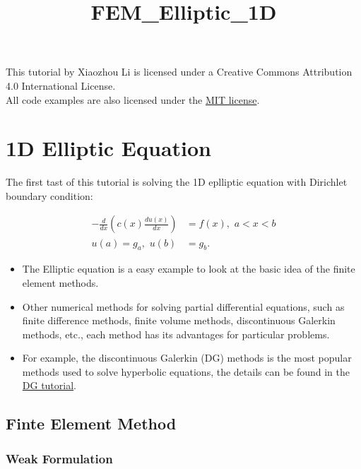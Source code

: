 \documentclass[11pt]{article}
\title{FEM\_Elliptic\_1D}
\providecommand{\tightlist}{%
      \setlength{\itemsep}{0pt}\setlength{\parskip}{0pt}}
\begin{document}
    
    
    \maketitle
    
    

    
    This tutorial by Xiaozhou Li is licensed under a Creative Commons
Attribution 4.0 International License.\\
All code examples are also licensed under the
\href{http://opensource.org/licenses/MIT}{MIT license}.

    \section{1D Elliptic Equation}\label{d-elliptic-equation}

The first tast of this tutorial is solving the 1D eplliptic equation
with Dirichlet boundary condition:

\begin{align}
   -\frac{d}{dx}\left(c(x)\frac{d u(x)}{dx}\right) & = f(x),\,\, a < x < b \\
   u(a) = g_a,\,\,u(b) & = g_b.
\end{align}

\begin{itemize}
\tightlist
\item
  The Elliptic equation is a easy example to look at the basic idea of
  the finite element methods.
\item
  Other numerical methods for solving partial differential equations,
  such as finite difference methods, finite volume methods,
  discontinuous Galerkin methods, etc., each method has its advantages
  for particular problems.
\item
  For example, the discontinuous Galerkin (DG) methods is the most
  popular methods used to solve hyperbolic equations, the details can be
  found in the \href{http://}{DG tutorial}.
\end{itemize}

    \subsection{Finte Element Method}\label{finte-element-method}

\subsubsection{Weak Formulation}\label{weak-formulation}
\end{document}
